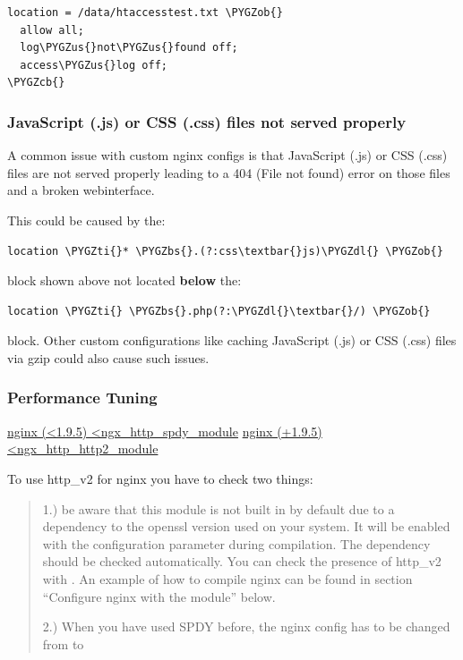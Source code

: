 \documentclass[letterpaper,10pt,english]{sphinxmanual}
\def\PYGZbs{\char`\\}
\def\PYGZus{\char`\_}
\def\PYGZob{\char`\{}
\def\PYGZcb{\char`\}}
\def\PYGZdl{\char`\$}
\def\PYGZti{\char`\~}
\begin{document}
\begin{Verbatim}[commandchars=\\\{\}]
location = /data/htaccesstest.txt \PYGZob{}
  allow all;
  log\PYGZus{}not\PYGZus{}found off;
  access\PYGZus{}log off;
\PYGZcb{}
\end{Verbatim}


\subsubsection{JavaScript (.js) or CSS (.css) files not served properly}
\label{installation/nginx_examples:javascript-js-or-css-css-files-not-served-properly}
A common issue with custom nginx configs is that JavaScript (.js)
or CSS (.css) files are not served properly leading to a 404 (File not found)
error on those files and a broken webinterface.

This could be caused by the:

\begin{Verbatim}[commandchars=\\\{\}]
location \PYGZti{}* \PYGZbs{}.(?:css\textbar{}js)\PYGZdl{} \PYGZob{}
\end{Verbatim}

block shown above not located \textbf{below} the:

\begin{Verbatim}[commandchars=\\\{\}]
location \PYGZti{} \PYGZbs{}.php(?:\PYGZdl{}\textbar{}/) \PYGZob{}
\end{Verbatim}

block. Other custom configurations like caching JavaScript (.js)
or CSS (.css) files via gzip could also cause such issues.


\subsubsection{Performance Tuning}
\label{installation/nginx_examples:performance-tuning}
\href{http://nginx.org/en/docs/http/ngx\_http\_spdy\_module.html}{nginx (\textless{}1.9.5) \textless{}ngx\_http\_spdy\_module}
\href{http://nginx.org/en/docs/http/ngx\_http\_v2\_module.html}{nginx (+1.9.5) \textless{}ngx\_http\_http2\_module}

To use http\_v2 for nginx you have to check two things:
\begin{quote}

1.) be aware that this module is not built in by default due to a dependency
to the openssl version used on your system. It will be enabled with the
 configuration parameter during compilation. The
dependency should be checked automatically. You can check the presence of
http\_v2 with . An example of how to
compile nginx can be found in section ``Configure nginx with the
 module'' below.

2.) When you have used SPDY before, the nginx config has to be changed from
 to 
\end{quote}
\end{document}
